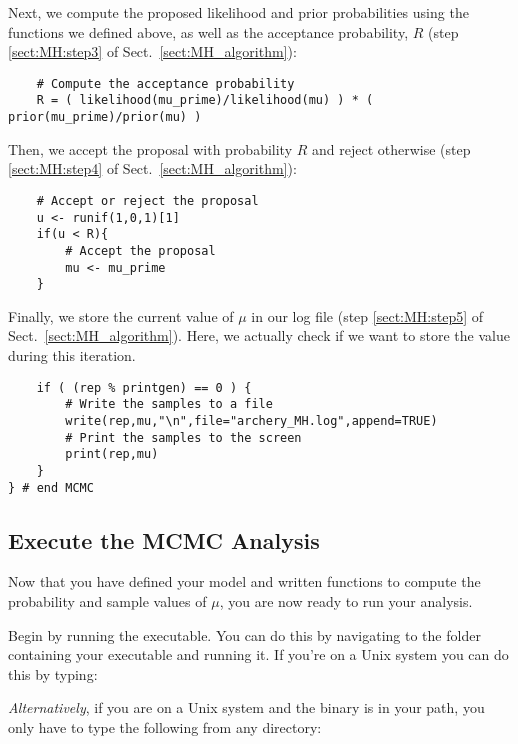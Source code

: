Next, we compute the proposed likelihood and prior probabilities using the functions we defined above, as well as the acceptance probability, $R$ (step \ref{sect:MH:step3} of Sect.\ \ref{sect:MH_algorithm}):
{\tt \begin{snugshade*}
\begin{lstlisting}    
    # Compute the acceptance probability
    R = ( likelihood(mu_prime)/likelihood(mu) ) * ( prior(mu_prime)/prior(mu) )
\end{lstlisting}
\end{snugshade*}}

Then, we accept the proposal with probability $R$ and reject otherwise (step \ref{sect:MH:step4} of Sect.\ \ref{sect:MH_algorithm}):
{\tt \begin{snugshade*}
\begin{lstlisting}    
    # Accept or reject the proposal
    u <- runif(1,0,1)[1]
    if(u < R){
        # Accept the proposal
        mu <- mu_prime
    }
\end{lstlisting}
\end{snugshade*}}

\pagebreak Finally, we store the current value of $\mu$ in our log file (step \ref{sect:MH:step5} of Sect.\ \ref{sect:MH_algorithm}).
Here, we actually check if we want to store the value during this iteration.
{\tt \begin{snugshade*}
\begin{lstlisting}
    if ( (rep % printgen) == 0 ) {
        # Write the samples to a file
        write(rep,mu,"\n",file="archery_MH.log",append=TRUE)
        # Print the samples to the screen
        print(rep,mu)
    }
} # end MCMC\end{lstlisting}
\end{snugshade*}}

\bigskip
\subsection{Execute the MCMC Analysis}\label{subsect:Exercise-RunMCMC}

Now that you have defined your model and written functions to compute the probability and sample values of $\mu$, you are now ready to run your analysis. 

{\begin{framed}
Begin by running the \RevBayes executable. 
You can do this by navigating to the folder containing your \RevBayes executable and running it. If you're on a Unix system you can do this by typing:

\colorbox{black}{\strut\hspace{1mm}\textcolor[rgb]{0,1,1}{}\hspace{0.925\textwidth}}

{\em Alternatively}, if you are on a Unix system and the \RevBayes binary is in your path, you only have to type the following from any directory:

\colorbox{black}{\strut\hspace{1mm}\textcolor[rgb]{0,1,1}{}\hspace{0.925\textwidth}}
\end{framed}}

